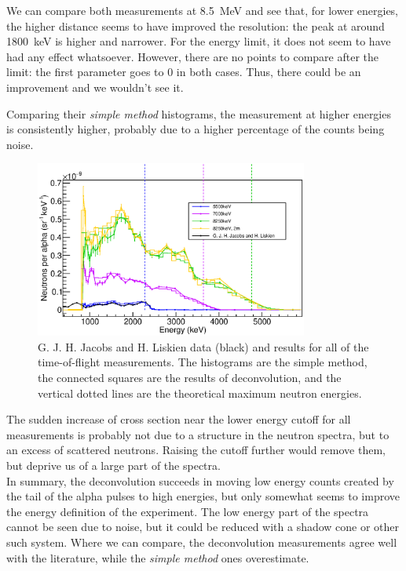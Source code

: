\documentclass[a4paper,12pt]{report}
\begin{document}
We can compare both measurements at \qty{8.5}{\MeV} and see that, for lower energies, the higher distance seems to have improved the resolution: the peak at around \qty{1800}{\keV} is higher and narrower.
For the energy limit, it does not seem to have had any effect whatsoever.
However, there are no points to compare after the limit: the first parameter goes to 0 in both cases.
Thus, there could be an improvement and we wouldn't see it.

Comparing their \textit{simple method} histograms, the measurement at higher energies is consistently higher, probably due to a higher percentage of the counts being noise.
\\

\begin{figure}[H]
	\centering
	\includegraphics[width=0.80\textwidth]{pulsed_results.eps}
	\caption{G. J. H. Jacobs and H. Liskien data (black) and results for all of the time-of-flight measurements.
	The histograms are the simple method, the connected squares are the results of deconvolution, and the vertical dotted lines are the theoretical maximum neutron energies.}
	\label{pulsed_results}
\end{figure}

The sudden increase of cross section near the lower energy cutoff for all measurements is probably not due to a structure in the neutron spectra, but to an excess of scattered neutrons.
Raising the cutoff further would remove them, but deprive us of a large part of the spectra.
\\

In summary, the deconvolution succeeds in moving low energy counts created by the tail of the alpha pulses to high energies, but only somewhat seems to improve the energy definition of the experiment.
The low energy part of the spectra cannot be seen due to noise, but it could be reduced with a shadow cone or other such system.
Where we can compare, the deconvolution measurements agree well with the literature, while the \textit{simple method} ones overestimate.
\end{document}
